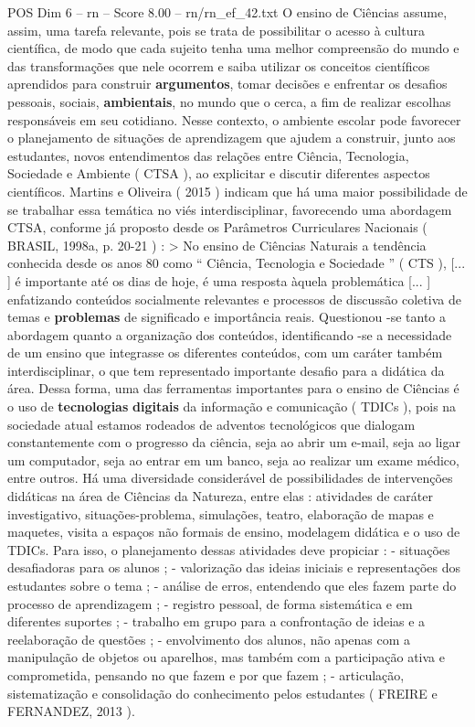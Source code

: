 \begin{textsample}{POS Dim 6 – rn – Score 8.00 – rn/rn\_ef\_42.txt}
O ensino de Ciências assume, assim, uma tarefa relevante, pois se trata de possibilitar o acesso à cultura científica, de modo que cada sujeito tenha uma melhor compreensão do mundo e das transformações que nele ocorrem e saiba utilizar os conceitos científicos aprendidos para construir \textbf{argumentos}, tomar decisões e enfrentar os desafios pessoais, sociais, \textbf{ambientais}, no mundo que o cerca, a fim de realizar escolhas responsáveis em seu cotidiano.
Nesse contexto, o ambiente escolar pode favorecer o planejamento de situações de aprendizagem que ajudem a construir, junto aos estudantes, novos entendimentos das relações entre Ciência, Tecnologia, Sociedade e Ambiente ( CTSA ), ao explicitar e discutir diferentes aspectos científicos.
Martins e Oliveira ( 2015 ) indicam que há uma maior possibilidade de se trabalhar essa temática no viés interdisciplinar, favorecendo uma abordagem CTSA, conforme já proposto desde os Parâmetros Curriculares Nacionais ( BRASIL, 1998a, p. 20-21 ) : > No ensino de Ciências Naturais a tendência conhecida desde os anos 80 como “ Ciência, Tecnologia e Sociedade ” ( CTS ), [... ] é importante até os dias de hoje, é uma resposta àquela problemática [... ] enfatizando conteúdos socialmente relevantes e processos de discussão coletiva de temas e \textbf{problemas} de significado e importância reais.
Questionou -se tanto a abordagem quanto a organização dos conteúdos, identificando -se a necessidade de um ensino que integrasse os diferentes conteúdos, com um caráter também interdisciplinar, o que tem representado importante desafio para a didática da área.
Dessa forma, uma das ferramentas importantes para o ensino de Ciências é o uso de \textbf{tecnologias} \textbf{digitais} da informação e comunicação ( TDICs ), pois na sociedade atual estamos rodeados de adventos tecnológicos que dialogam constantemente com o progresso da ciência, seja ao abrir um e-mail, seja ao ligar um computador, seja ao entrar em um banco, seja ao realizar um exame médico, entre outros.
Há uma diversidade considerável de possibilidades de intervenções didáticas na área de Ciências da Natureza, entre elas : atividades de caráter investigativo, situações-problema, simulações, teatro, elaboração de mapas e maquetes, visita a espaços não formais de ensino, modelagem didática e o uso de TDICs.
Para isso, o planejamento dessas atividades deve propiciar : - situações desafiadoras para os alunos ; - valorização das ideias iniciais e representações dos estudantes sobre o tema ; - análise de erros, entendendo que eles fazem parte do processo de aprendizagem ; - registro pessoal, de forma sistemática e em diferentes suportes ; - trabalho em grupo para a confrontação de ideias e a reelaboração de questões ; - envolvimento dos alunos, não apenas com a manipulação de objetos ou aparelhos, mas também com a participação ativa e comprometida, pensando no que fazem e por que fazem ; - articulação, sistematização e consolidação do conhecimento pelos estudantes ( FREIRE e FERNANDEZ, 2013 ).

\end{textsample}
